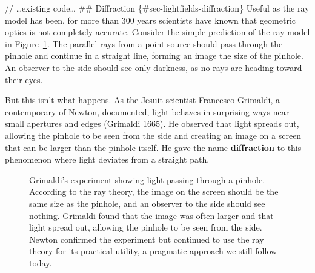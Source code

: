 \documentclass[
  letterpaper,
]{book}
\begin{document}
// \ldots existing code\ldots{} \#\# Diffraction
\{\#sec-lightfields-diffraction\} Useful as the ray model has been, for
more than 300 years scientists have known that geometric optics is not
completely accurate. Consider the simple prediction of the ray model in
Figure~\ref{fig-ray-wave}. The parallel rays from a point source should
pass through the pinhole and continue in a straight line, forming an
image the size of the pinhole. An observer to the side should see only
darkness, as no rays are heading toward their eyes.

But this isn't what happens. As the Jesuit scientist Francesco Grimaldi,
a contemporary of Newton, documented, light behaves in surprising ways
near small apertures and edges (Grimaldi 1665). He observed that light
spreads out, allowing the pinhole to be seen from the side and creating
an image on a screen that can be larger than the pinhole itself. He gave
the name \textbf{diffraction} to this phenomenon where light deviates
from a straight path.

\begin{figure}


\caption{\label{fig-ray-wave}Grimaldi's experiment showing light passing
through a pinhole. According to the ray theory, the image on the screen
should be the same size as the pinhole, and an observer to the side
should see nothing. Grimaldi found that the image was often larger and
that light spread out, allowing the pinhole to be seen from the side.
Newton confirmed the experiment but continued to use the ray theory for
its practical utility, a pragmatic approach we still follow today.}

\end{figure}%
\end{document}
